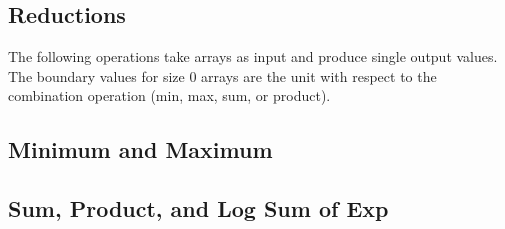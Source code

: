 \begin{description}
\begin{description}
\begin{description}
\begin{description}
\begin{description}
\begin{description}
\begin{description}
\begin{description}
\begin{description}
\begin{description}
\begin{description}
\begin{description}
\begin{description}
\begin{description}
\begin{description}
\begin{description}
\begin{description}
\begin{description}
\begin{description}
\begin{description}
\begin{description}
\begin{description}
\begin{description}
\begin{description}
\begin{description}
\section{Reductions}

The following operations take arrays as input and produce single output values.  The boundary values for size 0 arrays are the unit with respect to the combination operation (min, max, sum, or product).

\subsection{Minimum and Maximum}

\begin{description}  %

\subsection{Sum, Product, and Log Sum of Exp}


\end{description}
\end{description}
\end{description}
\end{description}
\end{description}
\end{description}
\end{description}
\end{description}
\end{description}
\end{description}
\end{description}
\end{description}
\end{description}
\end{description}
\end{description}
\end{description}
\end{description}
\end{description}
\end{description}
\end{description}
\end{description}
\end{description}
\end{description}
\end{description}
\end{description}
\end{description}
